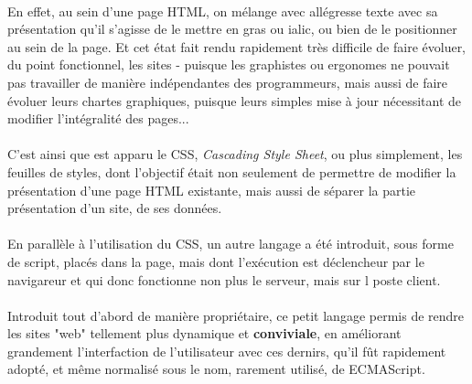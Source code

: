 {%

  \paragraph{} En effet, au sein d'une page HTML, on mélange avec allégresse texte avec sa
  présentation qu'il s'agisse de le mettre en gras ou ialic, ou bien de le positionner au sein de la
  page. Et cet état fait rendu rapidement très difficile de faire évoluer, du point fonctionnel, les sites -
  puisque les graphistes ou ergonomes ne pouvait pas travailler de manière indépendantes des
  programmeurs, mais aussi de faire évoluer leurs chartes graphiques, puisque leurs simples mise à
  jour nécessitant de modifier l'intégralité des pages...

  \paragraph{} C'est ainsi que est apparu le CSS, \textit{Cascading Style Sheet}, ou plus
  simplement, les feuilles de styles, dont l'objectif était non seulement de permettre de modifier
  la présentation d'une page HTML existante, mais aussi de séparer la partie présentation d'un site,
  de ses données.

  \paragraph{} En parallèle à l'utilisation du CSS, un autre langage a été introduit, sous forme de
  script, placés dans la page, mais dont l'exécution est déclencheur par le navigareur et qui donc
  fonctionne non plus le serveur, mais sur l poste client.

  \paragraph{} Introduit tout d'abord de manière propriétaire, ce petit langage permis de rendre les
  sites "web" tellement plus dynamique et \textbf{conviviale}, en améliorant grandement
  l'interfaction de l'utilisateur avec ces dernirs, qu'il fût rapidement adopté, et même normalisé
  sous le nom, rarement utilisé, de ECMAScript.
}




